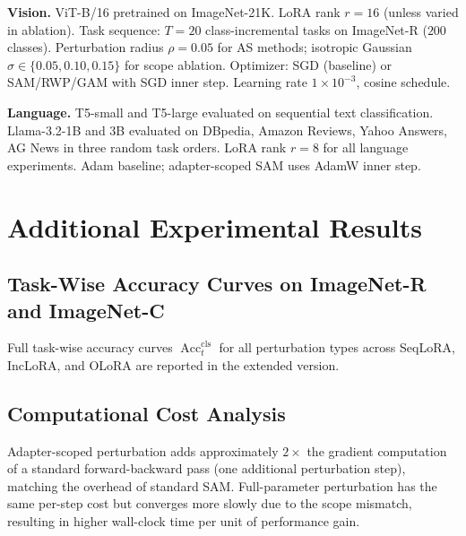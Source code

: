 \noindent\textbf{Vision.}
ViT-B/16 pretrained on ImageNet-21K.
LoRA rank $r=16$ (unless varied in ablation).
Task sequence: $T=20$ class-incremental tasks on ImageNet-R ($200$ classes).
Perturbation radius $\rho=0.05$ for AS methods; isotropic Gaussian $\sigma \in \{0.05, 0.10, 0.15\}$ for scope ablation.
Optimizer: SGD (baseline) or SAM/RWP/GAM with SGD inner step.
Learning rate $1\times10^{-3}$, cosine schedule.

\noindent\textbf{Language.}
T5-small and T5-large evaluated on sequential text classification.
Llama-3.2-1B and 3B evaluated on DBpedia, Amazon Reviews, Yahoo Answers, AG News in three random task orders.
LoRA rank $r=8$ for all language experiments.
Adam baseline; adapter-scoped SAM uses AdamW inner step.

\section{Additional Experimental Results}
\label{app:additional}

\subsection{Task-Wise Accuracy Curves on ImageNet-R and ImageNet-C}

Full task-wise accuracy curves $\operatorname{Acc}_t^{\mathrm{cls}}$ for all perturbation types across SeqLoRA, IncLoRA, and OLoRA are reported in the extended version.

\subsection{Computational Cost Analysis}

Adapter-scoped perturbation adds approximately $2\times$ the gradient computation of a standard forward-backward pass (one additional perturbation step), matching the overhead of standard SAM.
Full-parameter perturbation has the same per-step cost but converges more slowly due to the scope mismatch, resulting in higher wall-clock time per unit of performance gain.
